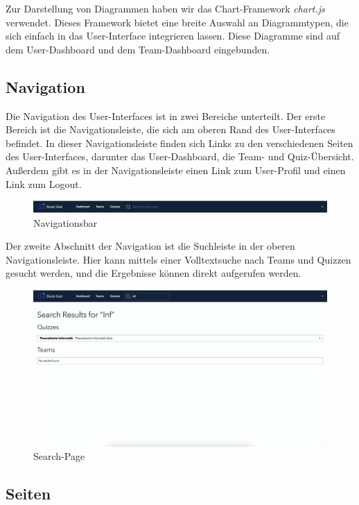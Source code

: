 \noindent Zur Darstellung von Diagrammen haben wir das Chart-Framework \textit{chart.js} verwendet. 
Dieses Framework bietet eine breite Auswahl an Diagrammtypen, die sich einfach in das 
User-Interface integrieren lassen. Diese Diagramme sind auf dem User-Dashboard und dem 
Team-Dashboard eingebunden.

\subsection{Navigation}

Die Navigation des User-Interfaces ist in zwei Bereiche unterteilt. 
Der erste Bereich ist die Navigationsleiste, die sich am oberen Rand des User-Interfaces befindet. 
In dieser Navigationsleiste finden sich Links zu den verschiedenen Seiten des User-Interfaces, 
darunter das User-Dashboard, die Team- und Quiz-Übersicht. Außerdem gibt es in der 
Navigationsleiste einen Link zum User-Profil und einen Link zum Logout.

\begin{figure}[H]
  \includegraphics[width=\linewidth]{img/navbar.png}
  \caption{Navigationsbar}
  \label{fig:navbar}
\end{figure}

\noindent Der zweite Abschnitt der Navigation ist die Suchleiste in der oberen Navigationsleiste. 
Hier kann mittels einer Volltextsuche nach Teams und Quizzen gesucht werden, und die Ergebnisse 
können direkt aufgerufen werden.

\begin{figure}[H]
  \includegraphics[width=\linewidth]{img/suche.png}
  \caption{Search-Page}
  \label{fig:searchbar}
\end{figure}
\subsection{Seiten}

